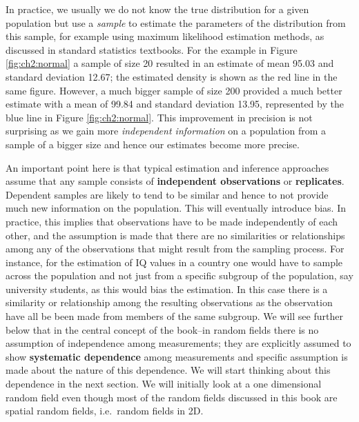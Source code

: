 In practice, we usually we do not know the true distribution for a given population but use a \textit{sample} to estimate the parameters of the distribution from this sample, for example using maximum likelihood estimation methods, as discussed in standard statistics textbooks. For the example in Figure \ref{fig:ch2:normal} a sample of size 20 resulted in an estimate of mean 95.03 and standard deviation 12.67; the estimated density is shown as the red line in the same figure. However, a much bigger sample of size 200 provided a much better estimate with a mean of 99.84 and standard deviation 13.95, represented by the blue line in Figure \ref{fig:ch2:normal}. This improvement in precision is not surprising as we gain more \textit{independent information} on a population from a sample of a bigger size and hence our estimates become more precise. 

An important point here is that typical estimation and inference approaches assume that any sample consists of \textbf{independent observations} or \textbf{replicates}.  Dependent samples are likely to tend to be similar and hence to not provide much new information on the population. This will eventually introduce bias.  In practice, this implies that observations have to be made independently of each other, and the assumption is made that there are no similarities or relationships among any of the observations that might result from the sampling process. For instance, for the estimation of IQ values in a country one would have to sample across the population and not just from a specific subgroup  of the population, say university students, as this would bias the estimation. In this case there is a similarity or relationship among the resulting observations as the observation have all be been made from members of the same subgroup.
We will see further below that in the central concept of the book--in random fields there is no assumption of independence among measurements; they are explicitly assumed to show \textbf{systematic dependence} among measurements and specific  assumption is made about the nature of this dependence. We will start thinking about this dependence in the next section. We will initially look at a one dimensional random field even though most of the random fields discussed in this book are spatial random fields, i.e.\ random fields in 2D.

